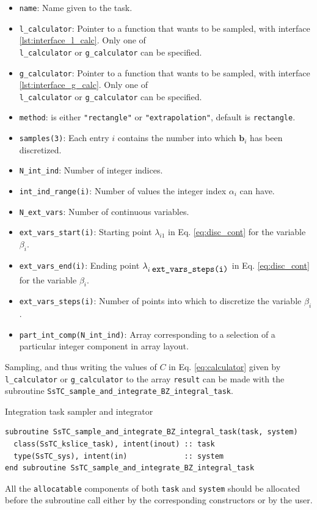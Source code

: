 \documentclass[10pt,a4paper]{article}
\begin{document}
\begin{tcolorbox}
\begin{itemize}
\item \verb|name|: Name given to the task.
\item \verb|l_calculator|: Pointer to a function that wants to be sampled, with interface \ref{lst:interface_l_calc}. Only one of \\ \verb|l_calculator| or \verb|g_calculator| can be specified.
\item \verb|g_calculator|: Pointer to a function that wants to be sampled, with interface \ref{lst:interface_g_calc}. Only one of \\ \verb|l_calculator| or \verb|g_calculator| can be specified.
\item \verb|method|: is either \verb|"rectangle"| or \verb|"extrapolation"|, default is \verb|rectangle|.
\item \verb|samples(3)|: Each entry $i$ contains the number into which $\bm{b}_i$ has been discretized.
\item \verb|N_int_ind|: Number of integer indices.
\item \verb|int_ind_range(i)|: Number of values the integer index $\alpha_i$ can have.
\item \verb|N_ext_vars|: Number of continuous variables.
\item \verb|ext_vars_start(i)|: Starting point $\lambda_{i1}$ in Eq. \eqref{eq:disc_cont} for the variable $\beta_i$.
\item \verb|ext_vars_end(i)|: Ending point $\lambda_{i\;\verb|ext_vars_steps(i)|}$ in Eq. \eqref{eq:disc_cont} for the variable $\beta_i$.
\item \verb|ext_vars_steps(i)|: Number of points into which to discretize the variable $\beta_i$.
\item \verb|part_int_comp(N_int_ind)|: Array corresponding to a selection of a particular integer component in array layout.
\end{itemize}
\end{tcolorbox}
Sampling, and thus writing the values of $C$ in Eq. \eqref{eq:calculator} given by \verb|l_calculator| or \verb|g_calculator| to the array \verb|result| can be made with the subroutine \verb|SsTC_sample_and_integrate_BZ_integral_task|.
\begin{codebox}{Integration task sampler and integrator}
\begin{lstlisting}[caption={Interface of the integrator task sampler and integrator.},captionpos=b]
subroutine SsTC_sample_and_integrate_BZ_integral_task(task, system)
  class(SsTC_kslice_task), intent(inout) :: task
  type(SsTC_sys), intent(in)             :: system
end subroutine SsTC_sample_and_integrate_BZ_integral_task
\end{lstlisting}
\end{codebox}
All the \verb|allocatable| components of both \verb|task| and \verb|system| should be allocated before the subroutine call either by the corresponding constructors or by the user.
\end{document}
